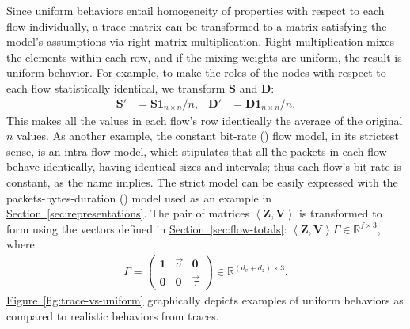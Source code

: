 \documentclass[twocolumn,final]{svjour3}
\newcommand{\caps}[1]{{\smaller{#1}}}
\newcommand{\Section}[1]{\hyperref[sec:#1]{Section~\ref*{sec:#1}}}
\newcommand{\Figure}[1]{\hyperref[fig:#1]{Figure~\ref*{fig:#1}}}
\newcommand{\R}{\mathbb{R}}
\newcommand{\ones}[1]{\mathbf{1}_{#1}}
\newcommand{\zeros}[1]{\mathbf{0}_{#1}}
\newcommand{\mat}[1]{\mathbf{#1}}
\newcommand{\seq}[1]{\left<#1\right>}
\begin{document}
Since uniform behaviors entail homogeneity of properties with respect to each flow individually, a trace matrix can be transformed to a matrix satisfying the model's assumptions via right matrix multiplication. Right multiplication mixes the elements within each row, and if the mixing weights are uniform, the result is uniform behavior. For example, to make the roles of the nodes with respect to each flow statistically identical, we transform $\mat{S}$ and $\mat{D}$:
\begin{align*}
\mat{S}' &= \mat{S}\ones{n \times n}/n, & \mat{D}' &= \mat{D}\ones{n \times n}/n.
\end{align*}
This makes all the values in each flow's row identically the average of the original $n$ values. As another example, the constant bit-rate (\caps{CBR}) flow model, in its strictest sense, is an intra-flow model, which stipulates that all the packets in each flow behave identically, having identical sizes and intervals; thus each flow's bit-rate is constant, as the name implies. The strict \caps{CBR} model can be easily expressed with the packets-bytes-duration (\caps{PBD}) model used as an example in \Section{representations}. The pair of matrices $\seq{\mat{Z},\mat{V}}$ is transformed to \caps{PBD} form using the vectors defined in \Section{flow-totals}: $\seq{\mat{Z},\mat{V}}\Gamma\in\R^{f \times 3}$, where
\begin{align}
\Gamma=\begin{pmatrix}
\ones{} & \vec{\sigma} & \zeros{} \\
\zeros{} & \zeros{} & \vec{\tau}
\end{pmatrix} \in \R^{(d_v+d_z)\times{3}}.
\end{align}
\Figure{trace-vs-uniform} graphically depicts examples of uniform behaviors as compared to realistic behaviors from traces.

\end{document}
